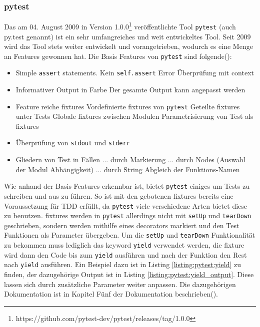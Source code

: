 \subsubsection{pytest}\label{python-tools:pytest}\mbox{}
\newline
Das am 04. August 2009 in Version
1.0.0\footnote{https://github.com/pytest-dev/pytest/releases/tag/1.0.0}
veröffentlichte Tool \lstinline{pytest} (auch py.test genannt)
ist ein sehr umfangreiches und weit entwickeltes Tool. Seit 2009 wird das Tool
stets weiter entwickelt und vorangetrieben, wodurch es eine Menge an Features
gewonnen hat.
\noindent
Die Basis Features von \lstinline{pytest} sind folgende(\cite{docs.pytest.org:4.4}):
\begin{itemize}
    \item Simple \lstinline{assert} statements.
    \subitem Kein \lstinline{self.assert}
    \subitem Error Überprüfung mit \Gls{context}
    \item Informativer Output in Farbe
    \subitem Der gesamte Output kann angepasst werden
    \item Feature reiche \Glspl{fixture}
    \subitem Vordefinierte \Glspl{fixture} von \lstinline{pytest}
    \subitem Geteilte \Glspl{fixture} unter Tests
    \subitem Globale \Glspl{fixture} zwischen Modulen
    \subitem Parametrisierung von Test als \Glspl{fixture}
    \item Überprüfung von \lstinline{stdout} und \lstinline{stderr}
    \item Gliedern von Test in Fällen
    \subitem ... durch Markierung
    \subitem ... durch Nodes (Auswahl der Modul Abhängigkeit)
    \subitem ... durch String Abgleich der Funktions-Namen
\end{itemize}
\noindent
Wie anhand der Basis Features erkennbar ist, bietet \lstinline{pytest} einiges
um Tests zu schreiben und aus zu führen. So ist mit den gebotenen
\Glspl{fixture} bereits eine Voraussetzung für TDD erfüllt, da
\lstinline{pytest} viele verschiedene Arten bietet diese zu benutzen.
\Glspl{fixture} werden in \lstinline{pytest} allerdings nicht mit
\lstinline{setUp} und \lstinline{tearDown} geschrieben, sondern werden mithilfe
eines \glspl{decorator} markiert und den Test Funktionen als Parameter
übergeben. Um die \lstinline{setUp} und \lstinline{tearDown} Funktionalität zu
bekommen muss lediglich das keyword \lstinline{yield} verwendet werden, die
\Gls{fixture} wird dann den Code bis zum \lstinline{yield} ausführen und nach
der Funktion den Rest nach \lstinline{yield} ausführen. Ein Beispiel dazu ist in
Listing \ref{listing:pytest:yield} zu finden, der dazugehörige Output ist in
Listing \ref{listing:pytest:yield_output}.
Diese lassen sich durch zusätzliche Parameter weiter anpassen. Die dazugehörigen
Dokumentation ist in Kapitel Fünf der Dokumentation
beschrieben(\cite{docs.pytest.org:4.4}).
\newline

